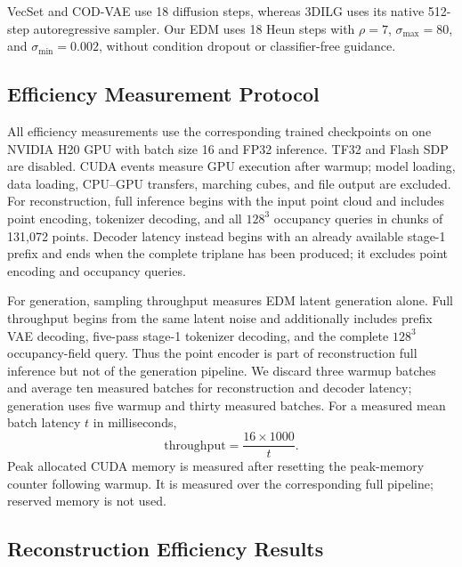 VecSet and COD-VAE use 18 diffusion steps, whereas 3DILG uses its native
512-step autoregressive sampler.  Our EDM uses 18 Heun steps with $\rho=7$,
$\sigma_{\max}=80$, and $\sigma_{\min}=0.002$, without condition dropout or
classifier-free guidance.

\subsection{Efficiency Measurement Protocol}

All efficiency measurements use the corresponding trained checkpoints on one
NVIDIA H20 GPU with batch size 16 and FP32 inference.  TF32 and Flash SDP are
disabled.  CUDA events measure GPU execution after warmup; model loading,
data loading, CPU--GPU transfers, marching cubes, and file output are excluded.
For reconstruction, full inference begins with the input point cloud and
includes point encoding, tokenizer decoding, and all $128^3$ occupancy queries
in chunks of 131,072 points. Decoder latency instead begins with an already
available stage-1 prefix and ends when the complete triplane has been
produced; it excludes point encoding and occupancy queries.

For generation, sampling throughput measures EDM latent generation alone.
Full throughput begins from the same latent noise and additionally includes
prefix VAE decoding, five-pass stage-1 tokenizer decoding, and the complete
$128^3$ occupancy-field query. Thus the point encoder is part of reconstruction
full inference but not of the generation pipeline. We discard three warmup
batches and average ten measured batches for reconstruction and decoder
latency; generation uses five warmup and thirty measured batches. For a
measured mean batch latency $t$ in milliseconds,
\begin{equation}
\mathrm{throughput}=\frac{16\times1000}{t}.
\end{equation}
Peak allocated CUDA memory is measured after resetting the peak-memory counter
following warmup. It is measured over the corresponding full pipeline;
reserved memory is not used.

\subsection{Reconstruction Efficiency Results}

